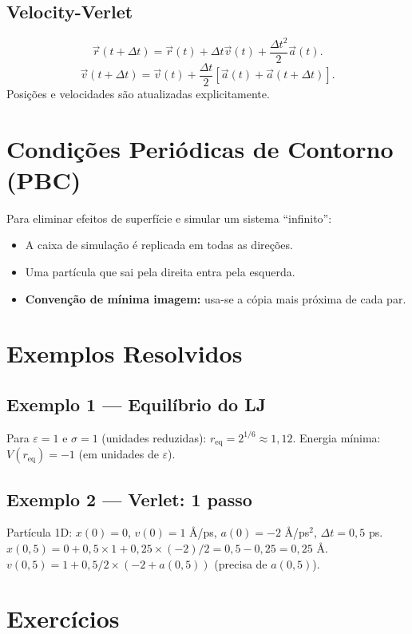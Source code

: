 \documentclass[12pt,a4paper]{article}
\begin{document}
\subsection*{Velocity-Verlet}
\[
\vec{r}(t+\Delta t) = \vec{r}(t) + \Delta t\vec{v}(t) + \frac{\Delta t^2}{2}\vec{a}(t).
\]
\[
\vec{v}(t+\Delta t) = \vec{v}(t) + \frac{\Delta t}{2}[\vec{a}(t) + \vec{a}(t+\Delta t)].
\]
Posi\c{c}\~oes e velocidades s\~ao atualizadas explicitamente.

\section*{Condi\c{c}\~oes Peri\'odicas de Contorno (PBC)}

Para eliminar efeitos de superf\'icie e simular um sistema ``infinito'':
\begin{itemize}
  \item A caixa de simula\c{c}\~ao \'e replicada em todas as dire\c{c}\~oes.
  \item Uma part\'icula que sai pela direita entra pela esquerda.
  \item \textbf{Conven\c{c}\~ao de m\'inima imagem:} usa-se a c\'opia mais pr\'oxima de cada par.
\end{itemize}

\section*{Exemplos Resolvidos}

\subsection*{Exemplo 1 --- Equil\'ibrio do LJ}
Para $\varepsilon=1$ e $\sigma=1$ (unidades reduzidas): $r_\text{eq} = 2^{1/6} \approx 1{,}12$. Energia m\'inima: $V(r_\text{eq}) = -1$ (em unidades de $\varepsilon$).

\subsection*{Exemplo 2 --- Verlet: 1 passo}
Part\'icula 1D: $x(0)=0$, $v(0)=1$ \AA/ps, $a(0)=-2$ \AA/ps$^2$, $\Delta t=0{,}5$ ps.
$x(0{,}5) = 0 + 0{,}5\times1 + 0{,}25\times(-2)/2 = 0{,}5 - 0{,}25 = 0{,}25$ \AA.
$v(0{,}5) = 1 + 0{,}5/2\times(-2 + a(0{,}5))$ (precisa de $a(0{,}5)$).

\section*{Exerc\'icios}
\end{document}
